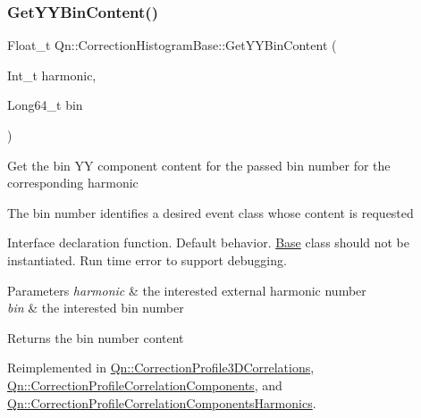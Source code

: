 \subsubsection{\texorpdfstring{Get\+Y\+Y\+Bin\+Content()}{GetYYBinContent()}\hspace{0.1cm}{\footnotesize\ttfamily [2/2]}}
{\footnotesize\ttfamily Float\+\_\+t Qn\+::\+Correction\+Histogram\+Base\+::\+Get\+Y\+Y\+Bin\+Content (\begin{DoxyParamCaption}\item[{Int\+\_\+t}]{harmonic,  }\item[{Long64\+\_\+t}]{bin }\end{DoxyParamCaption})\hspace{0.3cm}{\ttfamily [virtual]}}

Get the bin YY component content for the passed bin number for the corresponding harmonic

The bin number identifies a desired event class whose content is requested

Interface declaration function. Default behavior. \mbox{\hyperlink{classBase}{Base}} class should not be instantiated. Run time error to support debugging.


\begin{DoxyParams}{Parameters}
{\em harmonic} & the interested external harmonic number \\
\hline
{\em bin} & the interested bin number \\
\hline
\end{DoxyParams}
\begin{DoxyReturn}{Returns}
the bin number content 
\end{DoxyReturn}


Reimplemented in \mbox{\hyperlink{classQn_1_1CorrectionProfile3DCorrelations_a64bac99b0b417241e68ba9d133d07ef4}{Qn\+::\+Correction\+Profile3\+D\+Correlations}}, \mbox{\hyperlink{classQn_1_1CorrectionProfileCorrelationComponents_ae409fa99ff155d6a356af6f5901e2360}{Qn\+::\+Correction\+Profile\+Correlation\+Components}}, and \mbox{\hyperlink{classQn_1_1CorrectionProfileCorrelationComponentsHarmonics_a0256be6f18beb3a2562891e2912b55fb}{Qn\+::\+Correction\+Profile\+Correlation\+Components\+Harmonics}}.

\mbox{\label{classQn_1_1CorrectionHistogramBase_aec361c84c8291093f17ae6839384eeb9}} 
